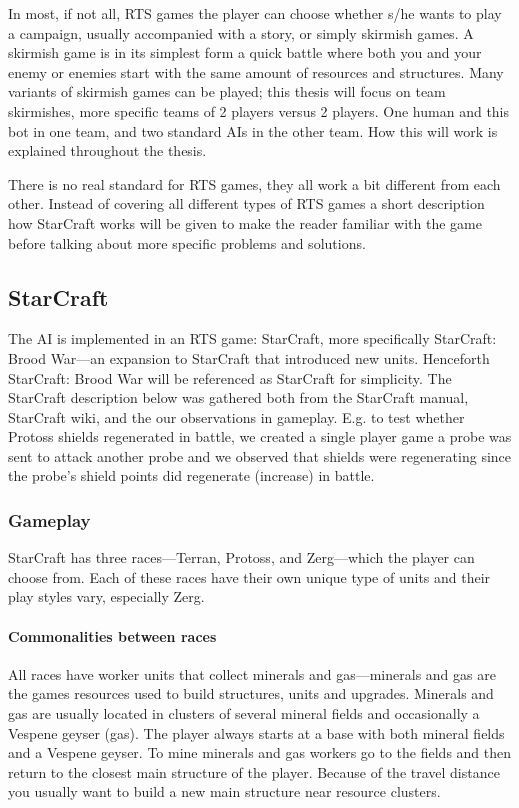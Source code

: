 In most, if not all, RTS games the player can choose whether s/he wants to play a campaign, usually accompanied with a story, or simply skirmish games. A skirmish game is in its simplest form a quick battle where both you and your enemy or enemies start with the same amount of resources and structures. Many variants of skirmish games can be played; this thesis will focus on team skirmishes, more specific teams of 2 players versus 2 players. One human and this bot in one team, and two standard AIs in the other team. How this will work is explained throughout the thesis.

There is no real standard for RTS games, they all work a bit different from each other. Instead of covering all different types of RTS games a short description how StarCraft works will be given to make the reader familiar with the game before talking about more specific problems and solutions.

\subsection{StarCraft}
The AI is implemented in an RTS game: StarCraft, more specifically StarCraft: Brood War—an expansion to StarCraft that introduced new units. Henceforth StarCraft: Brood War will be referenced as StarCraft for simplicity. The StarCraft description below was gathered both from the StarCraft manual, StarCraft wiki, and the our observations in gameplay. E.g. to test whether Protoss shields regenerated in battle, we created a single player game a probe was sent to attack another probe and we observed that shields were regenerating since the probe’s shield points did regenerate (increase) in battle.




\subsubsection{Gameplay}
StarCraft has three races—Terran, Protoss, and Zerg—which the player can choose from. Each of these races have their own unique type of units and their play styles vary, especially Zerg.

\paragraph{Commonalities between races}
All races have worker units that collect minerals and gas—minerals and gas are the games resources used to build structures, units and upgrades. Minerals and gas are usually located in clusters of several mineral fields and occasionally a Vespene geyser (gas). The player always starts at a base with both mineral fields and a Vespene geyser. To mine minerals and gas workers go to the fields and then return to the closest main structure of the player. Because of the travel distance you usually want to build a new main structure near resource clusters.

